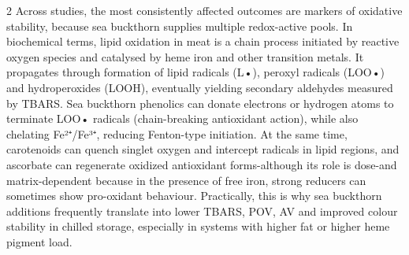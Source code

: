 \begin{multicols}{2}
Across studies, the most consistently affected outcomes are markers of
oxidative stability, because sea buckthorn supplies multiple
redox-active pools. In biochemical terms, lipid oxidation in meat is a
chain process initiated by reactive oxygen species and catalysed by heme
iron and other transition metals. It propagates through formation of
lipid radicals (L•), peroxyl radicals (LOO•) and hydroperoxides (LOOH),
eventually yielding secondary aldehydes measured by TBARS. Sea buckthorn
phenolics can donate electrons or hydrogen atoms to terminate LOO•
radicals (chain-breaking antioxidant action), while also chelating
Fe²⁺/Fe³⁺, reducing Fenton-type initiation. At the same time,
carotenoids can quench singlet oxygen and intercept radicals in lipid
regions, and ascorbate can regenerate oxidized antioxidant
forms-although its role is dose-and matrix-dependent because in the
presence of free iron, strong reducers can sometimes show pro-oxidant
behaviour. Practically, this is why sea buckthorn additions frequently
translate into lower TBARS, POV, AV and improved colour stability in
chilled storage, especially in systems with higher fat or higher heme
pigment load.
\end{multicols}

